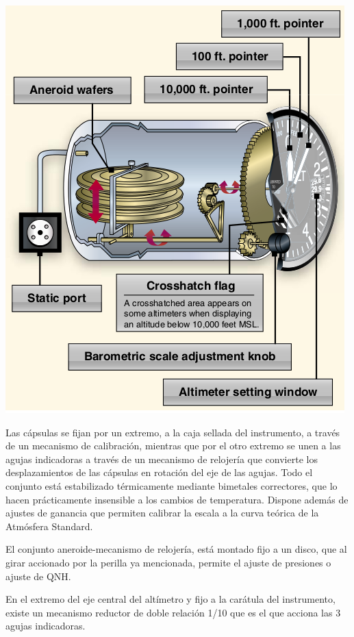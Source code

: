 \documentclass{article}
\begin{document}
\begin{center}
	\includegraphics[scale=0.5]{figuras/anemometro.png}
\label{fig:alt-1}
\end{center}
Las cápsulas se fijan por un extremo, a la caja sellada del instrumento, a través de un mecanismo de calibración, mientras que por el otro extremo se unen a las agujas indicadoras a través de un mecanismo de relojería que convierte los desplazamientos de las cápsulas en rotación del eje de las agujas. Todo el conjunto está estabilizado térmicamente mediante bimetales correctores, que lo hacen prácticamente insensible a los cambios de temperatura. Dispone además de ajustes de ganancia que permiten calibrar la escala a la curva teórica de la Atmósfera Standard.

El conjunto aneroide-mecanismo de relojería, está montado fijo a un disco, que al girar accionado por la perilla ya mencionada, permite el ajuste de presiones o ajuste de QNH.

En el extremo del eje central del altímetro y fijo a la carátula del instrumento, existe un mecanismo reductor de doble relación 1/10 que es el que acciona las 3 agujas indicadoras.
\end{document}
